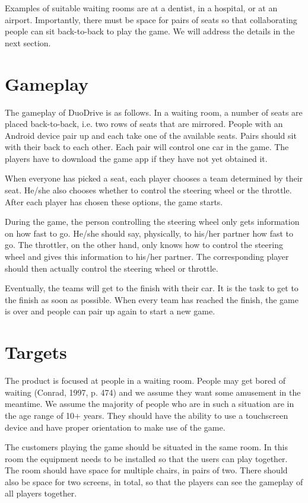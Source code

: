 \documentclass[11pt,twoside,a4paper]{article}
\begin{document}
Examples of suitable waiting rooms are at a dentist, in a hospital, or at an airport. Importantly, there must be space for pairs of seats so that collaborating people can sit back-to-back to play the game. We will address the details in the next section.


\section{Gameplay}
The gameplay of DuoDrive is as follows. In a waiting room, a number of seats are placed back-to-back, i.e. two rows of seats that are mirrored. People with an Android device pair up and each take one of the available seats. Pairs should sit with their back to each other. Each pair will control one car in the game. The players have to download the game app if they have not yet obtained it.

When everyone has picked a seat, each player chooses a team determined by their seat. He/she also chooses whether to control the steering wheel or the throttle. After each player has chosen these options, the game starts.

During the game, the person controlling the steering wheel only gets information on how fast to go. He/she should say, physically, to his/her partner how fast to go. The throttler, on the other hand, only knows how to control the steering wheel and gives this information to his/her partner. The corresponding player should then actually control the steering wheel or throttle.

Eventually, the teams will get to the finish with their car. It is the task to get to the finish as soon as possible. When every team has reached the finish, the game is over and people can pair up again to start a new game.


\section{Targets}
The product is focused at people in a waiting room. People may get bored of waiting (Conrad, 1997, p. 474) and we assume they want some amusement in the meantime. We assume the majority of people who are in such a situation are in the age range of 10+ years. They should have the ability to use a touchscreen device and have proper orientation to make use of the game.

The customers playing the game should be situated in the same room. In this room the equipment needs to be installed so that the users can play together. The room should have space for multiple chairs, in pairs of two. There should also be space for two screens, in total, so that the players can see the gameplay of all players together.
\end{document}
